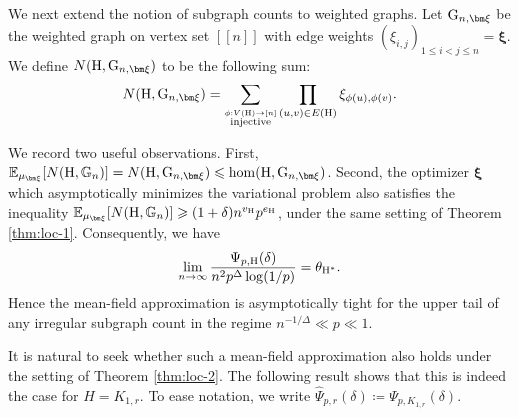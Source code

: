 \documentclass[a4paper,11pt,english,reqno]{amsart}
\numberwithin{equation}{section}
\renewcommand{\leq}{\leqslant}
\renewcommand{\geq}{\geqslant}
\newcommand{\E}{\mathbb{E}}
\newcommand{\uH}{\textup{H}}
\newcommand{\G}{\mathbb{G}}
\newcommand{\tu}[1]{\textup{#1}}
\newcommand{\set}[1]{[\![#1]\!]}
\newcommand{\red}[1]{{\color{red} #1}}
\newcommand{\purple}[1]{{\color{purple} #1}}
\begin{document}
	We next extend the notion of subgraph counts to weighted graphs. Let $\tu{G}_{n,{\bm \xi}}$ be the weighted graph on  vertex set $\set{n}$ with edge weights $(\xi_{i,j})_{1\leq i<j\leq n}={\bm \xi}$.
	We define $N(\uH, \tu{G}_{n,{\bm \xi}})$ to be the following sum:
	\[N(\uH, \tu{G}_{n,{\bm \xi}}) = \sum_{\stackrel{\phi:V(\uH)\rightarrow [n]}{\text{injective}}}\prod_{(u,v)\in E(\uH)}\xi_{\phi(u), \phi(v)}.\]

	We record two useful observations. First, 
	$\E_{\mu_{\bm \xi}}[N(\uH,\G_n)] = N(\uH, \tu{G}_{n, {\bm \xi}})\leq \hom(\uH, \tu{G}_{n, {\bm \xi}})$.
	Second, the optimizer ${\bm \xi}$ which asymptotically minimizes the variational problem \cite[Theorem~1.5]{BGLZ} also satisfies the inequality $\E_{\mu_{\bm \xi}}[N(\uH, \G_n)]\geq (1+\delta)n^{v_{\uH}}p^{e_\uH}$, under the same setting of Theorem \ref{thm:loc-1}.
	Consequently, we have 
	\begin{equation}\label{eq:Psi-limit}
	\lim_{n \to \infty} \frac{\Psi_{p,\uH}(\delta)}{n^{2}p^{\Delta}\log(1/p)}= %
	\theta_{\uH^{*}}. %
	\end{equation}
	Hence the mean-field approximation is asymptotically tight for the upper tail of any irregular subgraph count in the regime $n^{-1/\Delta} \ll p \ll 1$.
	
	It is natural to seek whether such a mean-field approximation also holds under the setting of Theorem \ref{thm:loc-2}. The following result shows that this is indeed the case for $H=K_{1,r}$. To ease notation, we write $\widehat \Psi_{p,r}(\delta)\coloneqq \Psi_{p, K_{1,r}}(\delta)$. 
	
	
	
	
	
	
	
	
	
	
	
	



	
\end{document}
